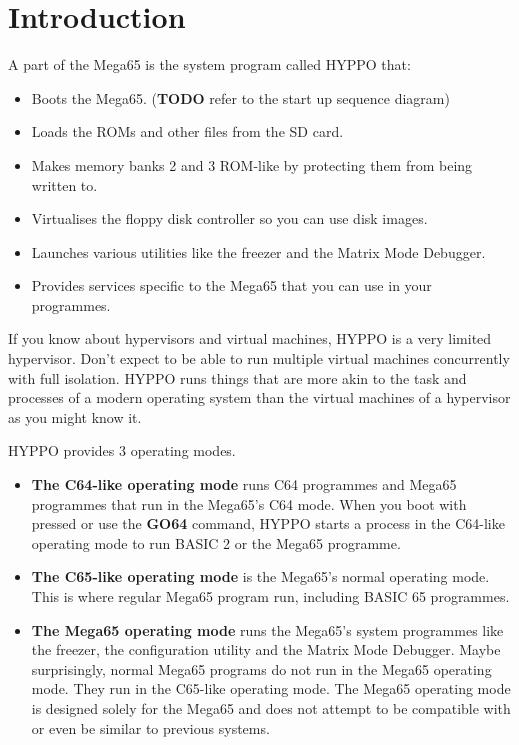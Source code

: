 \section{Introduction}
A part of the Mega65 is the system program called HYPPO that:
\begin{itemize}
  \item Boots the Mega65. ({\textbf{\color{red}TODO}} refer to the start up sequence diagram)
  \item Loads the ROMs and other files from the SD card.
  \item Makes memory banks 2 and 3 ROM-like by protecting them from being
        written to.
  \item Virtualises the floppy disk controller so you can use disk images.
  \item Launches various utilities like the freezer and the Matrix Mode Debugger.
  \item Provides services specific to the Mega65 that you can use in your
        programmes.
\end{itemize}

If you know about hypervisors and virtual machines, HYPPO is a very limited
hypervisor. Don't expect to be able to run multiple virtual machines
concurrently with full isolation. HYPPO runs things that are more akin to the
task and processes of a modern operating system than the virtual machines of a
hypervisor as you might know it.

HYPPO provides 3 operating modes.

\begin{itemize}
  \item \textbf{The C64-like operating mode} runs C64 programmes and Mega65
        programmes that run in the Mega65's C64 mode. When you boot with
        \megasymbolkey pressed or use the \textbf{GO64} command, HYPPO
        starts a process in the C64-like operating mode to run BASIC 2 or the
        Mega65 programme.
  \item \textbf{The C65-like operating mode} is the Mega65's normal operating
        mode. This is where regular Mega65 program run, including BASIC 65
        programmes.
  \item \textbf{The Mega65 operating mode} runs the Mega65's system programmes
        like the freezer, the configuration utility and the Matrix Mode
        Debugger. Maybe surprisingly, normal Mega65 programs do not run in the
        Mega65 operating mode. They run in the C65-like operating mode. The
        Mega65 operating mode is designed solely for the Mega65 and does not
        attempt to be compatible with or even be similar to previous systems.
\end{itemize}

